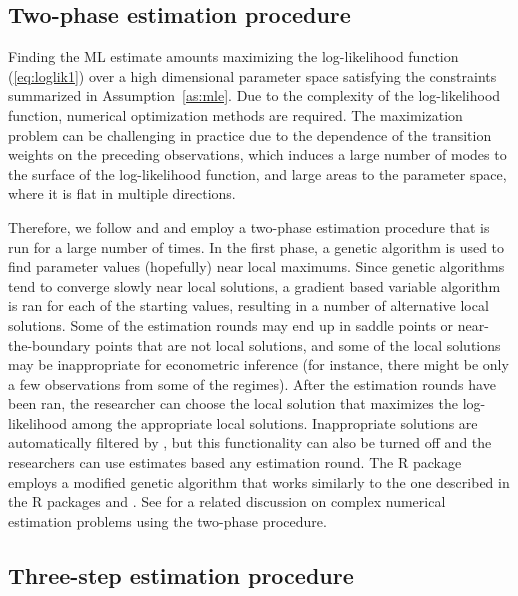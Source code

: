 \documentclass[nojss]{jss}
\begin{document}
\subsection{Two-phase estimation procedure}\label{sec:estimscheme}

Finding the ML estimate amounts maximizing the log-likelihood function (\ref{eq:loglik1}) over a high dimensional parameter space satisfying the constraints summarized in Assumption~\ref{as:mle}. Due to the complexity of the log-likelihood function, numerical optimization methods are required. The maximization problem can be challenging in practice due to the dependence of the transition weights on the preceding observations, which induces a large number of modes to the surface of the log-likelihood function, and large areas to the parameter space, where it is flat in multiple directions.

Therefore, we follow \cite{Meitz+Preve+Saikkonen:2023} and \cite{Virolainen:2022} and employ a two-phase estimation procedure that is run for a large number of times. In the first phase, a genetic algorithm is used to find parameter values (hopefully) near local maximums. Since genetic algorithms tend to converge slowly near local solutions, a gradient based variable algorithm \cite[algorithm 21, implemented by \citealp{R}]{Nash:1990} is ran for each of the starting values, resulting in a number of alternative local solutions. Some of the estimation rounds may end up in saddle points or near-the-boundary points that are not local solutions, and some of the local solutions may be  inappropriate for econometric inference (for instance, there might be only a few observations from some of the regimes). After the estimation rounds have been ran, the researcher can choose the local solution that maximizes the log-likelihood among the appropriate local solutions. Inappropriate solutions are automatically filtered by , but this functionality can also be turned off and the researchers can use estimates based any estimation round. The R package  employs a modified genetic algorithm that works similarly to the one described in the R packages  \citep{uGMAR} and  \citep{gmvarkit} \citep[the genetic algorithm and implemented in former is briefly described in][]{Virolainen:2022}. See \citet[Chapter~3]{Virolainen2:2022} for a related discussion on complex numerical estimation problems using the two-phase procedure.

\subsection{Three-step estimation procedure}\label{sec:three-step}
\end{document}
